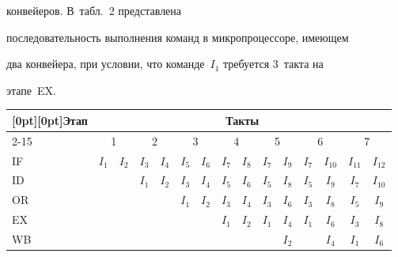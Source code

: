 конвейеров. В~табл.~2 представлена 


последовательность выполнения команд в микропроцессоре, имеющем 


два конвейера, при условии, что команде~$I_1$ требуется 3~такта на 


этапе~EX.


\begin{table}\small


\begin{center}




\vspace*{2ex}





\tabcolsep=6.8pt


\begin{tabular}{|l|c|c|c|c|c|c|c|c|c|c|c|c|c|c|}


\hline


\multicolumn{1}{|c|}{\raisebox{-6pt}[0pt][0pt]{Этап}}& \multicolumn{14}{c|}{Такты}\\


\cline{2-15}


&\multicolumn{2}{c|}{1} & \multicolumn{2}{c|}{2} &


\multicolumn{2}{c|}{3} & \multicolumn{2}{c|}{4} &


\multicolumn{2}{c|}{5} & \multicolumn{2}{c|}{6} & \multicolumn{2}{c|}{7}\\


\hline


IF &  $I_1$ & $I_2$ &$I_3$ & $I_4$ &$I_5$ & $I_6$ & $I_7$ & $I_8$ & $I_7$ & $I_9$ & $I_7$ & 


$I_{10}$ & $I_{11}$ & $I_{12}$\\




ID & &&$I_1$ &  $I_2$ & $I_3$ & $I_4$ & $I_5$ & $I_6$ & $I_5$ &$I_8$ &$I_5$ &$I_9$ & $I_7$ & $I_{10}$\\




OR &&&&& $I_1$ & $I_2$ &$I_3$ &$I_4$ & $I_3$ & $I_6$ & $I_3$ & $I_8$ & $I_5$ & $I_9$ \\




EX &&&&&&& $I_1$ & $I_2$ & $I_1$ & $I_4$ & $I_1$ &$I_6$ &$I_3$ &$I_8$ \\




WB &&&&&&&&&& $I_2$ & &$I_4$ & $I_1$ & $I_6$ \\


\hline


\end{tabular}


\end{center}


 \vspace*{2pt}


\end{table}



